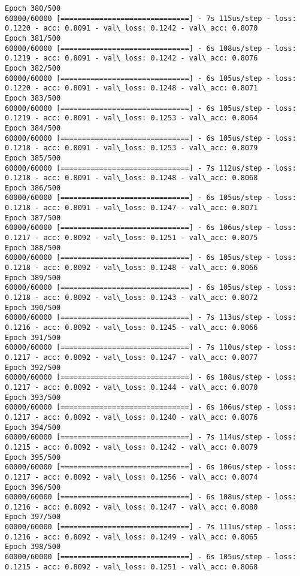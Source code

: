 \documentclass[11pt]{article}
\begin{document}
\begin{Verbatim}[commandchars=\\\{\}]
Epoch 380/500
60000/60000 [==============================] - 7s 115us/step - loss: 0.1220 - acc: 0.8091 - val\_loss: 0.1242 - val\_acc: 0.8070
Epoch 381/500
60000/60000 [==============================] - 6s 108us/step - loss: 0.1219 - acc: 0.8091 - val\_loss: 0.1242 - val\_acc: 0.8076
Epoch 382/500
60000/60000 [==============================] - 6s 105us/step - loss: 0.1220 - acc: 0.8091 - val\_loss: 0.1248 - val\_acc: 0.8071
Epoch 383/500
60000/60000 [==============================] - 6s 105us/step - loss: 0.1219 - acc: 0.8091 - val\_loss: 0.1253 - val\_acc: 0.8064
Epoch 384/500
60000/60000 [==============================] - 6s 105us/step - loss: 0.1218 - acc: 0.8091 - val\_loss: 0.1253 - val\_acc: 0.8079
Epoch 385/500
60000/60000 [==============================] - 7s 112us/step - loss: 0.1218 - acc: 0.8091 - val\_loss: 0.1248 - val\_acc: 0.8068
Epoch 386/500
60000/60000 [==============================] - 6s 105us/step - loss: 0.1218 - acc: 0.8091 - val\_loss: 0.1247 - val\_acc: 0.8071
Epoch 387/500
60000/60000 [==============================] - 6s 106us/step - loss: 0.1217 - acc: 0.8092 - val\_loss: 0.1251 - val\_acc: 0.8075
Epoch 388/500
60000/60000 [==============================] - 6s 105us/step - loss: 0.1218 - acc: 0.8092 - val\_loss: 0.1248 - val\_acc: 0.8066
Epoch 389/500
60000/60000 [==============================] - 6s 105us/step - loss: 0.1218 - acc: 0.8092 - val\_loss: 0.1243 - val\_acc: 0.8072
Epoch 390/500
60000/60000 [==============================] - 7s 113us/step - loss: 0.1216 - acc: 0.8092 - val\_loss: 0.1245 - val\_acc: 0.8066
Epoch 391/500
60000/60000 [==============================] - 7s 110us/step - loss: 0.1217 - acc: 0.8092 - val\_loss: 0.1247 - val\_acc: 0.8077
Epoch 392/500
60000/60000 [==============================] - 6s 108us/step - loss: 0.1217 - acc: 0.8092 - val\_loss: 0.1244 - val\_acc: 0.8070
Epoch 393/500
60000/60000 [==============================] - 6s 106us/step - loss: 0.1217 - acc: 0.8092 - val\_loss: 0.1240 - val\_acc: 0.8076
Epoch 394/500
60000/60000 [==============================] - 7s 114us/step - loss: 0.1215 - acc: 0.8092 - val\_loss: 0.1242 - val\_acc: 0.8079
Epoch 395/500
60000/60000 [==============================] - 6s 106us/step - loss: 0.1217 - acc: 0.8092 - val\_loss: 0.1256 - val\_acc: 0.8074
Epoch 396/500
60000/60000 [==============================] - 6s 108us/step - loss: 0.1216 - acc: 0.8092 - val\_loss: 0.1247 - val\_acc: 0.8080
Epoch 397/500
60000/60000 [==============================] - 7s 111us/step - loss: 0.1216 - acc: 0.8092 - val\_loss: 0.1249 - val\_acc: 0.8065
Epoch 398/500
60000/60000 [==============================] - 6s 105us/step - loss: 0.1215 - acc: 0.8092 - val\_loss: 0.1251 - val\_acc: 0.8068

\end{Verbatim}
\end{document}
